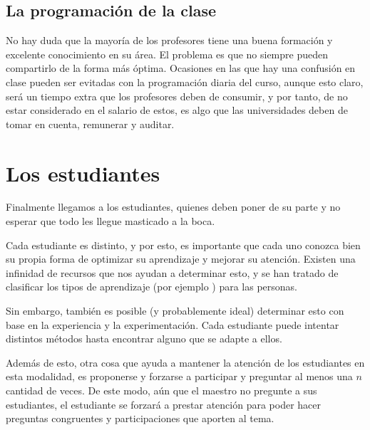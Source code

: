 \subsection{La programación de la clase}
No hay duda que la mayoría de los profesores tiene una buena formación y excelente conocimiento en su área. El problema es que no siempre pueden compartirlo de la forma más óptima. Ocasiones en las que hay una confusión en clase pueden ser evitadas con la programación diaria del curso, aunque esto claro, será un tiempo extra que los profesores deben de consumir, y por tanto, de no estar considerado en el salario de estos, es algo que las universidades deben de tomar en cuenta, remunerar y auditar. 

\section{Los estudiantes}

Finalmente llegamos a los estudiantes, quienes deben poner de su parte y no esperar que todo les llegue masticado a la boca.

Cada estudiante es distinto, y por esto, es importante que cada uno conozca bien su propia forma de optimizar su aprendizaje y mejorar su atención. Existen una infinidad de recursos que nos ayudan a determinar esto, y se han tratado de clasificar los tipos de aprendizaje (por ejemplo \cite{LearnStyle}) para las personas.

Sin embargo, también es posible (y probablemente ideal) determinar esto con base en la experiencia y la experimentación. Cada estudiante puede intentar distintos métodos hasta encontrar alguno que se adapte a ellos.

Además de esto, otra cosa que ayuda a mantener la atención de los estudiantes en esta modalidad, es proponerse y forzarse a participar y preguntar al menos una $n$ cantidad de veces. De este modo, aún que el maestro no pregunte a sus estudiantes, el estudiante se forzará a prestar atención para poder hacer preguntas congruentes y participaciones que aporten al tema.